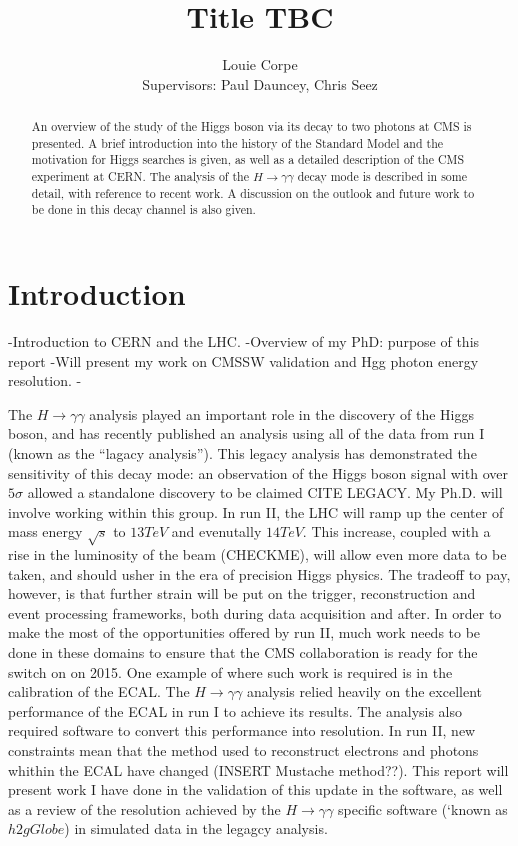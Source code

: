 \documentclass[10pt]{article}
\title{Title TBC}
\author{Louie Corpe \\Supervisors: Paul Dauncey, Chris Seez }
\begin{document}
\maketitle

\renewcommand{\abstractname}{Abstract}
\begin{abstract}
{\large
An overview of the study of the Higgs boson via its decay to two photons at CMS is presented. A brief introduction into the history of the Standard Model and the motivation for Higgs searches is given, as well as a detailed description of the CMS experiment at CERN. The analysis of the $H \rightarrow \gamma\gamma$ decay mode is described in some detail, with reference to recent work. A discussion on the outlook and future work to be done in this decay channel is also given.}
\end{abstract}

\newpage

\tableofcontents

\newpage 
\section{Introduction}

-Introduction to CERN and the LHC.
-Overview of my PhD: purpose of this report
-Will present my work on CMSSW validation and Hgg photon energy resolution.
-

The $H \rightarrow \gamma \gamma$ analysis played an important role in the discovery of the Higgs boson, and has recently published an analysis using all of the data from run I (known as the ``lagacy analysis''). This legacy analysis has demonstrated the sensitivity of this decay mode: an observation of the Higgs boson signal with over $5 \sigma$ allowed a standalone discovery to be claimed CITE LEGACY. My Ph.D. will involve working within this group. In run II, the LHC will ramp up the center of mass energy $ \sqrt{s}$ to $13TeV$ and evenutally $14TeV$. This increase, coupled with a rise in the luminosity of the beam (CHECKME), will allow even more data to be taken, and should usher in the era of precision Higgs physics. The tradeoff to pay, however, is that further strain will be put on the trigger, reconstruction and event processing frameworks, both during data acquisition and after. In order to make the most of the opportunities offered by run II, much work needs to be done in these domains to ensure that the CMS collaboration is ready for the switch on on 2015. One example of where such work is required is in the calibration of the ECAL. The $H \rightarrow \gamma \gamma$ analysis relied heavily on the excellent performance of the ECAL in run I to achieve its results. The analysis also required software to convert this performance into resolution. In run II, new constraints mean that the method used to reconstruct electrons and photons whithin the ECAL have changed (INSERT Mustache method??). This report will present work I have done in the validation of this update in the software, as well as a review of the resolution achieved by the $H \rightarrow \gamma \gamma$ specific software (`known as $h2gGlobe$) in simulated data in the legagcy analysis.
\end{document}
